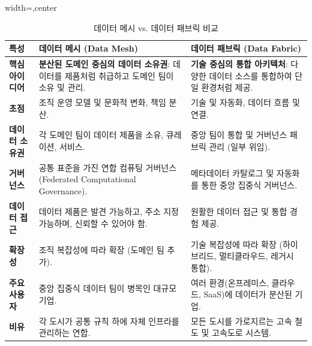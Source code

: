 \documentclass[11pt,a4paper]{article}
\begin{document}
\begin{table}[htbp]
\centering
\caption{데이터 메시 vs. 데이터 패브릭 비교}
\label{tab:mesh_vs_fabric}
\begin{adjustbox}{width=\textwidth,center}
\begin{tabular}{p{3cm} p{6.5cm} p{6.5cm}}
\toprule
\textbf{특성} & \textbf{데이터 메시 (Data Mesh)} & \textbf{데이터 패브릭 (Data Fabric)} \\
\midrule
\textbf{핵심 아이디어} & \textbf{분산된 도메인 중심의 데이터 소유권}: 데이터를 제품처럼 취급하고 도메인 팀이 소유 및 관리. & \textbf{기술 중심의 통합 아키텍처}: 다양한 데이터 소스를 통합하여 단일 환경처럼 제공. \\
\textbf{초점} & 조직 운영 모델 및 문화적 변화, 책임 분산. & 기술 및 자동화, 데이터 흐름 및 연결. \\
\textbf{데이터 소유권} & 각 도메인 팀이 데이터 제품을 소유, 큐레이션, 서비스. & 중앙 팀이 통합 및 거버넌스 패브릭 관리 (일부 위임). \\
\textbf{거버넌스} & 공통 표준을 가진 연합 컴퓨팅 거버넌스 (Federated Computational Governance). & 메타데이터 카탈로그 및 자동화를 통한 중앙 집중식 거버넌스. \\
\textbf{데이터 접근} & 데이터 제품은 발견 가능하고, 주소 지정 가능하며, 신뢰할 수 있어야 함. & 원활한 데이터 접근 및 통합 경험 제공. \\
\textbf{확장성} & 조직 복잡성에 따라 확장 (도메인 팀 추가). & 기술 복잡성에 따라 확장 (하이브리드, 멀티클라우드, 레거시 통합). \\
\textbf{주요 사용자} & 중앙 집중식 데이터 팀이 병목인 대규모 기업. & 여러 환경(온프레미스, 클라우드, SaaS)에 데이터가 분산된 기업. \\
\textbf{비유} & 각 도시가 공통 규칙 하에 자체 인프라를 관리하는 연합. & 모든 도시를 가로지르는 고속 철도 및 고속도로 시스템. \\
\bottomrule
\end{tabular}
\end{adjustbox}
\end{table}
\end{document}
